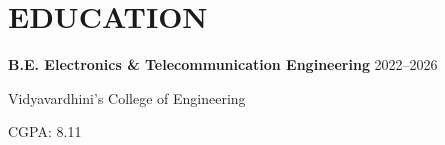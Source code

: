 \section*{EDUCATION}

\textbf{B.E. Electronics \& Telecommunication Engineering}
\hfill 2022--2026

Vidyavardhini's College of Engineering

CGPA: 8.11
